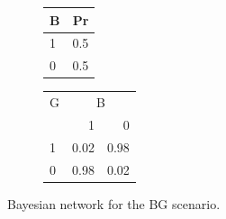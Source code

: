 \documentclass[
  10pt,
]{scrartcl}
\begin{document}
\begin{figure}[H]
\begin{subfigure}[!ht]{0.4\textwidth}
\begin{tabular}{lr}
\toprule
B & Pr\\
\midrule
1 & 0.5\\
0 & 0.5\\
\bottomrule
\end{tabular}


\begin{tabular}{lrr}
\toprule
\multicolumn{1}{c}{G} & \multicolumn{2}{c}{B} \\
  & 1 & 0\\
\midrule
1 & 0.02 & 0.98\\
0 & 0.98 & 0.02\\
\bottomrule
\end{tabular}
\end{subfigure}
\label{fig-BG}
\caption{Bayesian network for the \textsf{BG} scenario.}
\end{figure}
\end{document}
